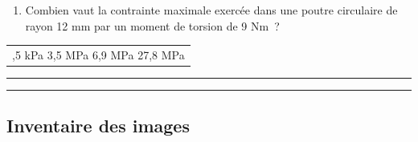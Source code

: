 \begin{enumerate}
\def\labelenumi{\arabic{enumi}.}
\setcounter{enumi}{21}
\tightlist
\item
  Combien vaut la contrainte maximale exercée dans une poutre circulaire de rayon 12 mm par un moment de torsion de 9 Nm~?
\end{enumerate}

\begin{longtable}[]{@{}l@{}}
\toprule\noalign{}
\endhead
\bottomrule\noalign{}
\endlastfoot
3,5 kPa 3,5 MPa 6,9 MPa 27,8 MPa \\
\end{longtable}

\begin{center}\rule{0.5\linewidth}{0.5pt}\end{center}

\begin{center}\rule{0.5\linewidth}{0.5pt}\end{center}

\hypertarget{inventaire-des-images}{%
\subsection{Inventaire des images}\label{inventaire-des-images}}

